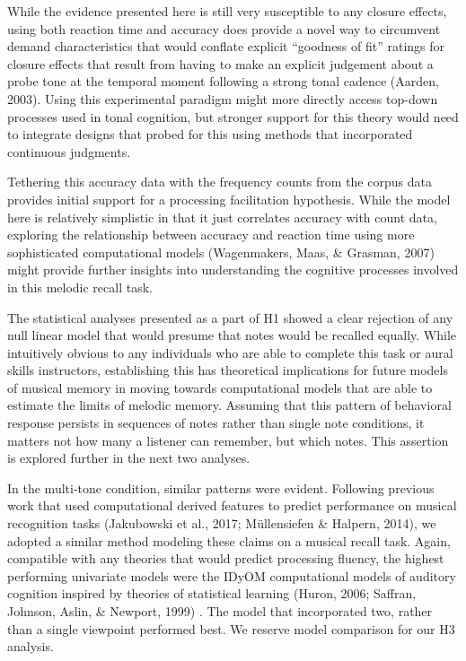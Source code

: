\documentclass[english,man,floatsintext]{apa6}
\begin{document}
While the evidence presented here is still very susceptible to any closure effects, using both reaction time and accuracy does provide a novel way to circumvent demand characteristics that would conflate explicit \enquote{goodness of fit} ratings for closure effects that result from having to make an explicit judgement about a probe tone at the temporal moment following a strong tonal cadence (Aarden, 2003).
Using this experimental paradigm might more directly access top-down processes used in tonal cognition, but stronger support for this theory would need to integrate designs that probed for this using methods that incorporated continuous judgments.

Tethering this accuracy data with the frequency counts from the corpus data provides initial support for a processing facilitation hypothesis.
While the model here is relatively simplistic in that it just correlates accuracy with count data, exploring the relationship between accuracy and reaction time using more sophisticated computational models (Wagenmakers, Maas, \& Grasman, 2007) might provide further insights into understanding the cognitive processes involved in this melodic recall task.

The statistical analyses presented as a part of H1 showed a clear rejection of any null linear model that would presume that notes would be recalled equally.
While intuitively obvious to any individuals who are able to complete this task or aural skills instructors, establishing this has theoretical implications for future models of musical memory in moving towards computational models that are able to estimate the limits of melodic memory.
Assuming that this pattern of behavioral response persists in sequences of notes rather than single note conditions, it matters not how many a listener can remember, but which notes.
This assertion is explored further in the next two analyses.

In the multi-tone condition, similar patterns were evident. Following previous work that used computational derived features to predict performance on musical recognition tasks (Jakubowski et al., 2017; Müllensiefen \& Halpern, 2014), we adopted a similar method modeling these claims on a musical recall task.
Again, compatible with any theories that would predict processing fluency, the highest performing univariate models were the IDyOM computational models of auditory cognition inspired by theories of statistical learning (Huron, 2006; Saffran, Johnson, Aslin, \& Newport, 1999) .
The model that incorporated two, rather than a single viewpoint performed best.
We reserve model comparison for our H3 analysis.
\end{document}
